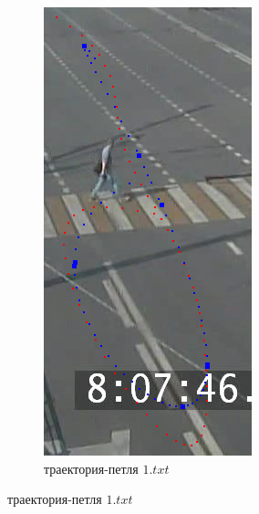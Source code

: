 \begin{figure}[!htb]
\begin{subfigure}[!htb]{0.3\textwidth}
		\includegraphics[width=\textwidth]{images/regr_kp_loop.png}
		\caption{траектория-петля $1.txt$}

\end{subfigure}
\end{figure}
